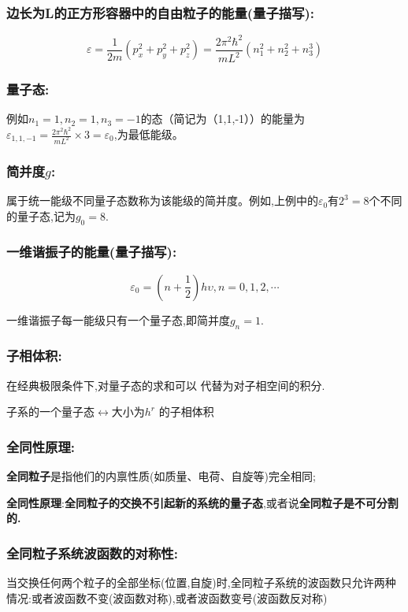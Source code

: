\documentclass[12pt]{ctexart}
\numberwithin{equation}{subsection}
\begin{document}
	\subsubsection{ 边长为L的正方形容器中的自由粒子的能量(量子描写):}
		\begin{equation}
			\varepsilon  = \frac{1}{{2m}}\left( {p_x^2 + p_y^2 + p_z^2} \right) = \frac{{2{\pi ^2}{\hbar ^2}}}{{m{L^2}}}\left( {n_1^2 + n_2^2 + n_3^3} \right)
		\end{equation}
	\subsubsection{ 量子态:}
		例如${n_1} = 1,{n_2} = 1,{n_3} =  - 1$的态（简记为（1,1,-1））的能量为${\varepsilon _{1,1, - 1}} = \frac{{2{\pi ^2}{\hbar ^2}}}{{m{L^2}}} \times 3 = {\varepsilon _0}$,为最低能级。
	\subsubsection{ 简并度\texorpdfstring{$g$}.:}
		属于统一能级不同量子态数称为该能级的简并度。例如,上例中的${\varepsilon _0}$有$2^3=8$个不同的量子态,记为$g_0=8$.
	\subsubsection{ 一维谐振子的能量(量子描写):}
		\begin{equation}
			{\varepsilon _0} = \left( {n + \frac{1}{2}} \right)h\upsilon ,n = 0,1,2, \cdots 
		\end{equation}
		
		一维谐振子每一能级只有一个量子态,即简并度$g_n=1$.
	\subsubsection{ 子相体积:}
		在\colorbox{yellow!100}{经典极限条件下},对量子态的求和可以 代替为对子相空间的积分.
		\centerline{\footnotesize 子系的一个量子态$\longleftrightarrow$大小为$h^r$ 的子相体积}
	\subsubsection{ 全同性原理:}
		\textbf{全同粒子}是指他们的内禀性质(如质量、电荷、自旋等)完全相同;

		\textbf{全同性原理}:\textbf{全同粒子的交换不引起新的系统的量子态},或者说\textbf{全同粒子是不可分割的.}
	\subsubsection{ \textbf{全同粒子系统}波函数的对称性:}
		当交换任何两个粒子的全部坐标(位置,自旋)时,全同粒子系统的波函数只允许两种情况:或者波函数不变(波函数对称),或者波函数变号(波函数反对称)
\end{document}
